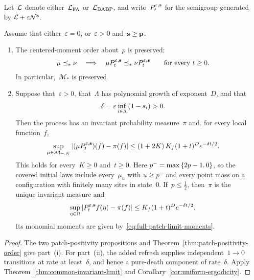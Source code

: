 Let~$\mathcal{L}$ denote either~$\mathcal{L}_{\mathrm{FA}}$ or~$\mathcal{L}_{\mathrm{BABP}}$, and
write~$P_t^{\varepsilon,\mathbf{s}}$ for the semigroup generated by
$\mathcal{L}+\varepsilon\mathcal{N}^{\mathbf{s}}$.

\begin{proposition}
\label{prop:fa-babp-consequences}
Assume that either~$\varepsilon=0$, or~$\varepsilon>0$ and~$\mathbf{s}\geq\mathbf{p}$.
\begin{enumerate}[label=\textup{(\roman*)}]
\item The centered-moment order about~$p$ is preserved:
\begin{equation*}
\mu\preceq_*\nu
\quad\Longrightarrow\quad
\mu P_t^{\varepsilon,\mathbf{s}}
\preceq_*
\nu P_t^{\varepsilon,\mathbf{s}}
\qquad
\text{for every }t\geq0.
\end{equation*}
In particular,~$\mathcal M_*$ is preserved.

\item Suppose that~$\varepsilon>0$, that~$\Lambda$ has polynomial growth of
exponent~$D$, and that
\begin{equation*}
\delta
=
\varepsilon\inf_{i\in\Lambda}\left(1-s_i\right)
>
0.
\end{equation*}
Then the process has an invariant probability measure~$\pi$ and, for every
local function~$f$,
\begin{equation*}
\sup_{\mu\in\mathcal M_{-,K}}
\left|(\mu P_t^{\varepsilon,\mathbf{s}})(f)-\pi(f)\right|
\leq
\left(1+2K\right)K_f(1+t)^D e^{-\delta t/2}.
\end{equation*}
This holds for every~$K\geq0$ and~$t\geq0$. Here
$p^-=\max\left\{2p-1,0\right\}$, so the covered initial laws include every~$\mu_u$ with
$u\geq p^-$ and every point mass on a configuration with finitely many sites
in state~$0$.
If~$p\leq\frac12$, then~$\pi$ is the unique invariant measure and
\begin{equation*}
\sup_{\eta\in\Omega}
\left|P_t^{\varepsilon,\mathbf{s}}f(\eta)-\pi(f)\right|
\leq
K_f(1+t)^D e^{-\delta t/2}.
\end{equation*}
Its monomial moments are given by~\eqref{eq:full-patch-limit-moments}.
\end{enumerate}
\end{proposition}

\begin{proof}
The two patch-positivity propositions and
Theorem~\ref{thm:patch-positivity-order} give part~\textup{(i)}. For
part~\textup{(ii)}, the added refresh supplies independent~$1\to0$ transitions
at rate at least~$\delta$, and hence a pure-death component of rate~$\delta$.
Apply Theorem~\ref{thm:common-invariant-limit} and
Corollary~\ref{cor:uniform-ergodicity}.
\end{proof}

\fi
